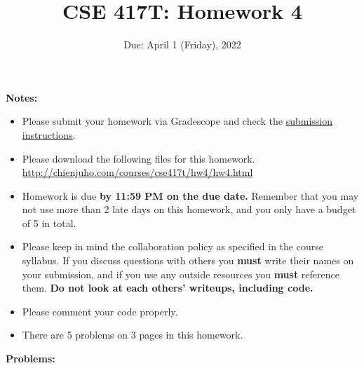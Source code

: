 \documentclass[11pt]{article}
\begin{document}
\title{CSE 417T: Homework 4}
\date{Due: April 1 (Friday), 2022}

\maketitle


\noindent \textbf{Notes: } 
\begin{itemize}

\item Please submit your homework via Gradescope and check the \href{http://chienjuho.com/courses/cse417t/hw_instructions.html}{\underline{submission instructions}}.

\item Please download the following files for this homework.\\
    \url{http://chienjuho.com/courses/cse417t/hw4/hw4.html}

\item Homework is due \textbf{by 11:59 PM on the due date.} Remember that
  you may not use more than 2 late days on this homework, and you
  only have a budget of 5 in total.

\item Please keep in mind the collaboration policy as specified in the
  course syllabus. If you discuss questions with 
others you \textbf{must} write their names on your submission, and if
you use any outside resources you \textbf{must} reference
them. \textbf{Do not look at each others' writeups, including code.}

\item Please comment your code properly.

\item There are 5 problems on 3 pages in this homework. 

\end{itemize}

\noindent \textbf{Problems:}
\end{document}
